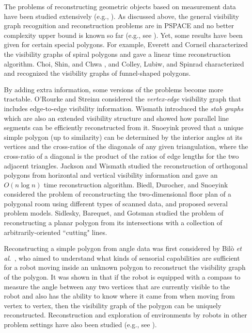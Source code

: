 \documentclass[11pt]{article}
\begin{document}
The problems of reconstructing geometric objects based on measurement
data have been studied extensively (e.g.,
\cite{ref:BiedlRe09,ref:BiloRe09,ref:JacksonOr02,ref:SidleskyPo06,ref:SnoeyinkCr99}).
As discussed above, the general visibility graph recognition and
reconstruction problems are in PSPACE \cite{ref:EverettVi90} and no better
complexity upper bound is known so far (e.g., see \cite{ref:EverettNe95}). 
Yet, some results have been given for certain special polygons. 
For example, Everett and
Corneil \cite{ref:ErerettRe90} characterized the visibility graphs of 
spiral polygons and
gave a linear time reconstruction algorithm. Choi, Shin, and Chwa
\cite{ref:ChoiCh95}, and Colley, Lubiw, and Spinrad
\cite{ref:ColleyVi97} characterized and
recognized the visibility graphs of funnel-shaped polygons. 

By adding extra information, some versions of the problems become more tractable. 
O'Rourke and Streinu \cite{ref:ORourkeTh98} considered the {\em
vertex-edge} visibility graph that includes edge-to-edge visibility
information. Wismath \cite{ref:WismathPo00} 
introduced the {\em stab graphs} which are
also an extended visibility structure and showed how parallel line
segments can be efficiently reconstructed from it. 
Snoeyink \cite{ref:SnoeyinkCr99} proved that a unique simple
polygon (up to similarity) can be determined by the interior angles at
its vertices and the cross-ratios of the diagonals of any given
triangulation, where the cross-ratio of a diagonal is the product of
the ratios of edge lengths for the two adjacent triangles. 
Jackson and Wismath \cite{ref:JacksonOr02} studied the reconstruction
of orthogonal polygons from horizontal and vertical visibility
information and gave an $O(n\log n)$ time reconstruction algorithm. 
Biedl, Durocher, and Snoeyink \cite{ref:BiedlRe09} considered the problem of
reconstructing the two-dimensional floor plan of a polygonal room
using different types of scanned data, and proposed several problem models.
Sidlesky, Barequet, and Gotsman
\cite{ref:SidleskyPo06} studied the problem of reconstructing a planar
polygon from its intersections with a collection of
arbitrarily-oriented ``cutting" lines. 


Reconstructing a simple polygon from angle data was first
considered by Bil\`o {\em et al}.~\cite{ref:BiloRe09}, who aimed to understand what kinds of
sensorial capabilities are sufficient for a robot moving inside an unknown
polygon to reconstruct the visibility graph of the polygon. 
It was shown in \cite{ref:BiloRe09} that if the robot is equipped with a compass
to measure the angle between any two vertices that are
currently visible to the robot
and also has the ability to know where it came from when
moving from vertex to vertex, 
then the visibility graph of the polygon
can be uniquely reconstructed. Reconstruction and exploration of environments 
by robots in other problem settings have also been studied (e.g.,
see \cite{ref:DudekRo91,ref:FlocchiniTh99,ref:SuriSi08}). 
\end{document}
